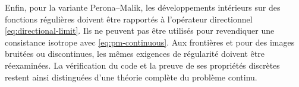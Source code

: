 Enfin, pour la variante Perona--Malik, les développements intérieurs
sur des fonctions régulières doivent être rapportés à l'opérateur
directionnel \eqref{eq:directional-limit}. Ils ne peuvent pas être
utilisés pour revendiquer une consistance isotrope avec
\eqref{eq:pm-continuous}. Aux frontières et pour des images bruitées
ou discontinues, les mêmes exigences de régularité doivent être
réexaminées. La vérification du code et la preuve de ses propriétés
discrètes restent ainsi distinguées d'une théorie complète du
problème continu.
